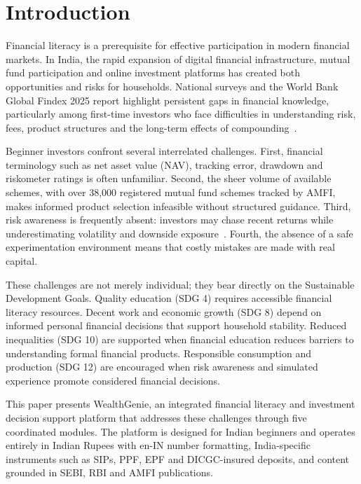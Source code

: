 \section{Introduction}

Financial literacy is a prerequisite for effective participation in modern financial markets. In India, the rapid expansion of digital financial infrastructure, mutual fund participation and online investment platforms has created both opportunities and risks for households. National surveys and the World Bank Global Findex 2025 report highlight persistent gaps in financial knowledge, particularly among first-time investors who face difficulties in understanding risk, fees, product structures and the long-term effects of compounding~\cite{worldbank2025}.

Beginner investors confront several interrelated challenges. First, financial terminology such as net asset value (NAV), tracking error, drawdown and riskometer ratings is often unfamiliar. Second, the sheer volume of available schemes, with over 38,000 registered mutual fund schemes tracked by AMFI, makes informed product selection infeasible without structured guidance. Third, risk awareness is frequently absent: investors may chase recent returns while underestimating volatility and downside exposure~\cite{sebi_understanding_mutual_funds}. Fourth, the absence of a safe experimentation environment means that costly mistakes are made with real capital.

These challenges are not merely individual; they bear directly on the Sustainable Development Goals. Quality education (SDG 4) requires accessible financial literacy resources. Decent work and economic growth (SDG 8) depend on informed personal financial decisions that support household stability. Reduced inequalities (SDG 10) are supported when financial education reduces barriers to understanding formal financial products. Responsible consumption and production (SDG 12) are encouraged when risk awareness and simulated experience promote considered financial decisions.

This paper presents WealthGenie, an integrated financial literacy and investment decision support platform that addresses these challenges through five coordinated modules. The platform is designed for Indian beginners and operates entirely in Indian Rupees with en-IN number formatting, India-specific instruments such as SIPs, PPF, EPF and DICGC-insured deposits, and content grounded in SEBI, RBI and AMFI publications.

